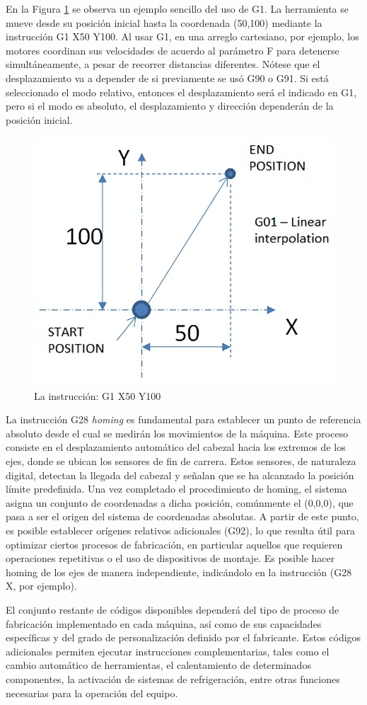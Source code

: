 En la Figura \ref{g1} se observa un ejemplo sencillo del uso de G1. La herramienta se mueve desde su posición inicial hasta la coordenada (50,100) mediante la instrucción G1 X50 Y100. Al usar G1, en una arreglo cartesiano, por ejemplo, los motores coordinan sus velocidades de acuerdo al parámetro F para detenerse simultáneamente, a pesar de recorrer distancias diferentes. Nótese que el desplazamiento va a depender de si previamente se usó G90 o G91. Si está seleccionado el modo relativo, entonces el desplazamiento será el indicado en G1, pero si el modo es absoluto, el desplazamiento y dirección dependerán de la posición inicial.


\begin{figure}[h!]
    \centering
    \includegraphics[width=0.5\linewidth]{imgs/g1.png}
    \caption{La instrucción: G1 X50 Y100}
    \label{g1}
\end{figure}


La instrucción G28 \textit{homing} es fundamental para establecer un punto de referencia absoluto desde el cual se medirán los movimientos de la máquina. Este proceso consiste en el desplazamiento automático del cabezal hacia los extremos de los ejes, donde se ubican los sensores de fin de carrera. Estos sensores, de naturaleza digital, detectan la llegada del cabezal y señalan que se ha alcanzado la posición límite predefinida. Una vez completado el procedimiento de homing, el sistema asigna un conjunto de coordenadas a dicha posición, comúnmente el (0,0,0), que pasa a ser el origen del sistema de coordenadas absolutas. A partir de este punto, es posible establecer orígenes relativos adicionales (G92), lo que resulta útil para optimizar ciertos procesos de fabricación, en particular aquellos que requieren operaciones repetitivas o el uso de dispositivos de montaje. Es posible hacer homing de los ejes de manera independiente, indicándolo en la instrucción (G28 X, por ejemplo).

El conjunto restante de códigos disponibles dependerá del tipo de proceso de fabricación implementado en cada máquina, así como de sus capacidades específicas y del grado de personalización definido por el fabricante. Estos códigos adicionales permiten ejecutar instrucciones complementarias, tales como el cambio automático de herramientas, el calentamiento de determinados componentes, la activación de sistemas de refrigeración, entre otras funciones necesarias para la operación del equipo.

